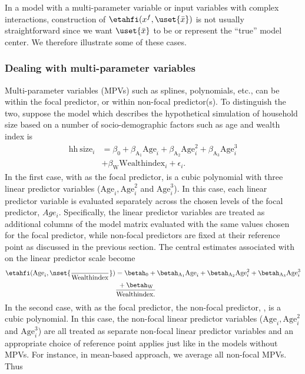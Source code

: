 In a model with a multi-parameter variable or input variables with complex interactions, construction of $\etahfi(x^f, \uset{{\bar{x}}})$ is not usually straightforward since we want $\uset{{\bar{x}}}$ to be or represent the ``true'' model center. We therefore illustrate some of these cases.

\subsubsection{Dealing with multi-parameter variables}

Multi-parameter variables (MPVs) such as splines, polynomials, etc., can be within the focal predictor, or within non-focal predictor(s). To distinguish the two, suppose the model which describes the hypothetical simulation of household size based on a number of socio-demographic factors such as age and wealth index is
%
\begin{align}\label{eq:lm_cubic}
\mathrm{hh~size}_i &= \beta_0 + \beta_{\mathrm{A_1}}\mathrm{Age}_i + \beta_{\mathrm{A_2}}\mathrm{Age}^2_i + \beta_{\mathrm{A_3}}\mathrm{Age}^3_i\nonumber \\
&+ \beta_{\mathrm{W}}\mathrm{Wealthindex}_i + \epsilon_i.
\end{align}
%
In the first case, with  as the focal predictor, is a cubic polynomial with three linear predictor variables ($\mathrm{Age}_i, \mathrm{Age}^2_i$ and $\mathrm{Age}^3_i$). In this case, each linear predictor variable is evaluated separately across the chosen levels of the focal predictor, $Age_i$. Specifically, the linear predictor variables are treated as additional columns of the model matrix evaluated with the same values chosen for the focal predictor, while non-focal predictors are fixed at their reference point as discussed in the previous section. The central estimates associated with  on the linear predictor scale become
%
\begin{align}
\etahfi(\mathrm{Age}_i, \nset{{\over{\mathrm{Wealthindex}}}}) &= \betah_0 + \betah_{\mathrm{A_1}}\mathrm{Age}_i + \betah_{\mathrm{A_2}}\mathrm{Age}^2_i + \betah_{\mathrm{A_3}}\mathrm{Age}^3_i \nonumber\\
	& + \betah_{\mathrm{W}}\over{\mathrm{Wealthindex}}.
\end{align}
%
In the second case, with  as the focal predictor, the non-focal predictor, , is a cubic polynomial. In this case, the non-focal linear predictor variables ($\mathrm{Age}_i, \mathrm{Age}^2_i$ and $\mathrm{Age}^3_i$) are all treated as separate non-focal linear predictor variables and an appropriate choice of reference point applies just like in the models without MPVs. For instance, in mean-based approach, we average all non-focal MPVs. Thus
